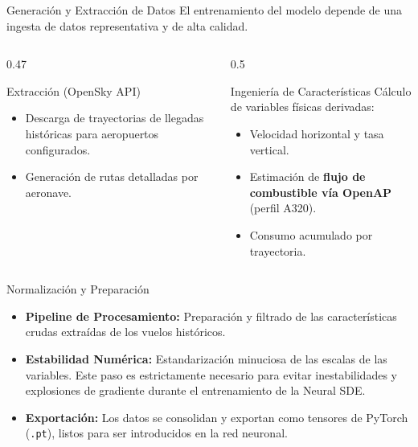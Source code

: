 \documentclass[aspectratio=169]{beamer}
\begin{document}
\begin{frame}{Generación y Extracción de Datos}
  El entrenamiento del modelo depende de una ingesta de datos representativa y de alta calidad.
  \begin{columns}
    \begin{column}{0.47\textwidth}
      \begin{block}{Extracción (OpenSky API)}
        \begin{itemize}
          \item Descarga de trayectorias de llegadas históricas para aeropuertos configurados.
          \item Generación de rutas detalladas por aeronave.
        \end{itemize}
      \end{block}
    \end{column}
    \begin{column}{0.5\textwidth}
      \begin{block}{Ingeniería de Características}
        Cálculo de variables físicas derivadas:
        \begin{itemize}
          \item Velocidad horizontal y tasa vertical.
          \item Estimación de \textbf{flujo de combustible vía OpenAP} (perfil A320).
          \item Consumo acumulado por trayectoria.
        \end{itemize}
      \end{block}
    \end{column}
  \end{columns}
\end{frame}

\begin{frame}{Normalización y Preparación}
  \begin{itemize}
    \item \textbf{Pipeline de Procesamiento:} Preparación y filtrado de las características crudas extraídas de los vuelos históricos.
    \item \textbf{Estabilidad Numérica:} Estandarización minuciosa de las escalas de las variables. Este paso es estrictamente necesario para evitar inestabilidades y explosiones de gradiente durante el entrenamiento de la Neural SDE.
    \item \textbf{Exportación:} Los datos se consolidan y exportan como tensores de PyTorch (\texttt{.pt}), listos para ser introducidos en la red neuronal.
  \end{itemize}
\end{frame}
\end{document}
